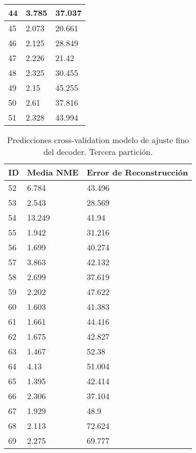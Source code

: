 \begin{table}[!ht]
\begin{tabular}{|l|l|l|}
        44 & 3.785 & 37.037 \\ \hline
        45 & 2.073 & 20.661 \\ \hline
        46 & 2.125 & 28.849 \\ \hline
        47 & 2.226 & 21.42 \\ \hline
        48 & 2.325 & 30.455 \\ \hline
        49 & 2.15 & 45.255 \\ \hline
        50 & 2.61 & 37.816 \\ \hline
        51 & 2.328 & 43.994 \\ \hline
    \end{tabular}
\end{table}

\begin{table}[!ht]
    \centering
    \caption{Predicciones cross-validation modelo de ajuste fino del  decoder. Tercera partición.}
    \begin{tabular}{|l|l|l|}
    \hline
    \cellcolor{gray!25}\textbf{ID} & \cellcolor{gray!25}\textbf{Media NME} & \cellcolor{gray!25}\textbf{Error de Reconstrucción} \\ \hline
        52 & 6.784 & 43.496 \\ \hline
        53 & 2.543 & 28.569 \\ \hline
        54 & 13.249 & 41.94 \\ \hline
        55 & 1.942 & 31.216 \\ \hline
        56 & 1.699 & 40.274 \\ \hline
        57 & 3.863 & 42.132 \\ \hline
        58 & 2.699 & 37.619 \\ \hline
        59 & 2.202 & 47.622 \\ \hline
        60 & 1.603 & 41.383 \\ \hline
        61 & 1.661 & 44.416 \\ \hline
        62 & 1.675 & 42.827 \\ \hline
        63 & 1.467 & 52.38 \\ \hline
        64 & 4.13 & 51.004 \\ \hline
        65 & 1.395 & 42.414 \\ \hline
        66 & 2.306 & 37.104 \\ \hline
        67 & 1.929 & 48.9 \\ \hline
        68 & 2.113 & 72.624 \\ \hline
        69 & 2.275 & 69.777 \\ \hline

\end{tabular}
\end{table}
